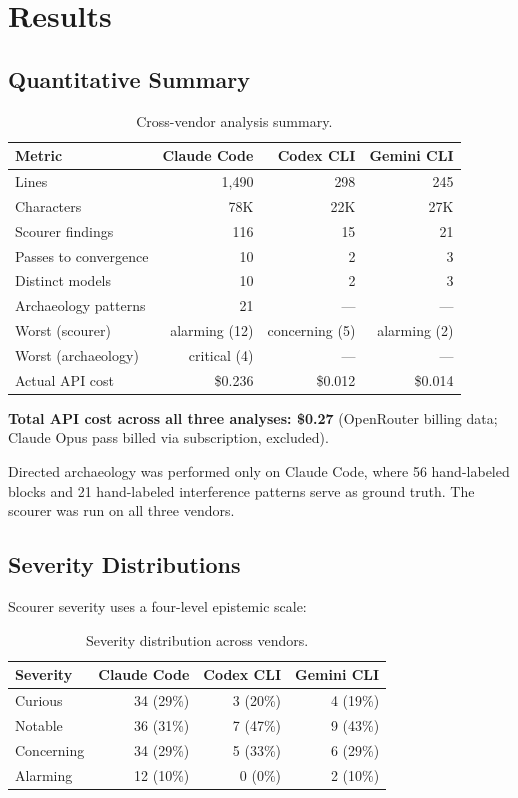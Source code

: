 \documentclass[11pt,a4paper]{article}
\begin{document}
\section{Results}
\label{sec:results}

\subsection{Quantitative Summary}
\label{sec:quantitative}

\begin{table}[H]
\centering
\caption{Cross-vendor analysis summary.}
\label{tab:results-summary}
\begin{tabular}{@{}lrrr@{}}
\toprule
Metric & Claude Code & Codex CLI & Gemini CLI \\
\midrule
Lines & 1{,}490 & 298 & 245 \\
Characters & 78K & 22K & 27K \\
Scourer findings & 116 & 15 & 21 \\
Passes to convergence & 10 & 2 & 3 \\
Distinct models & 10 & 2 & 3 \\
Archaeology patterns & 21 & --- & --- \\
Worst (scourer) & alarming (12) & concerning (5) & alarming (2) \\
Worst (archaeology) & critical (4) & --- & --- \\
Actual API cost & \$0.236 & \$0.012 & \$0.014 \\
\bottomrule
\end{tabular}
\end{table}

\textbf{Total API cost across all three analyses: \$0.27} (OpenRouter
billing data; Claude Opus pass billed via subscription, excluded).

Directed archaeology was performed only on Claude Code, where 56
hand-labeled blocks and 21 hand-labeled interference patterns serve as
ground truth. The scourer was run on all three vendors.


\subsection{Severity Distributions}
\label{sec:severity}

Scourer severity uses a four-level epistemic scale:

\begin{table}[H]
\centering
\caption{Severity distribution across vendors.}
\label{tab:severity}
\begin{tabular}{@{}lrrr@{}}
\toprule
Severity & Claude Code & Codex CLI & Gemini CLI \\
\midrule
Curious & 34 (29\%) & 3 (20\%) & 4 (19\%) \\
Notable & 36 (31\%) & 7 (47\%) & 9 (43\%) \\
Concerning & 34 (29\%) & 5 (33\%) & 6 (29\%) \\
Alarming & 12 (10\%) & 0 (0\%) & 2 (10\%) \\
\bottomrule
\end{tabular}
\end{table}
\end{document}
